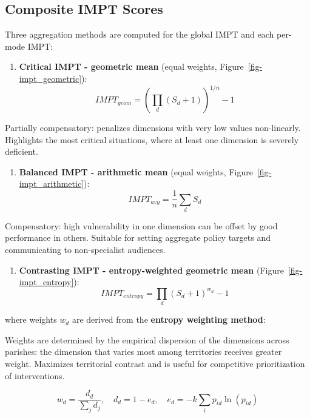 \documentclass[
  authoryear,
  review,
  1p]{elsarticle}
\providecommand{\tightlist}{%
  \setlength{\itemsep}{0pt}\setlength{\parskip}{0pt}}
\begin{document}
\subsection{Composite IMPT Scores}\label{sec-MET_composite_impt}

Three aggregation methods are computed for the global IMPT and each
per-mode IMPT:

\begin{enumerate}
\def\labelenumi{\arabic{enumi}.}
\tightlist
\item
  \textbf{Critical IMPT - geometric mean} (equal weights,
  Figure~\ref{fig-impt_geometric}):
  \[IMPT_{geom} = \left(\prod_{d} (S_d + 1)\right)^{1/n} - 1\]
\end{enumerate}

Partially compensatory: penalizes dimensions with very low values
non-linearly. Highlights the most critical situations, where at least
one dimension is severely deficient.

\begin{enumerate}
\def\labelenumi{\arabic{enumi}.}
\setcounter{enumi}{1}
\tightlist
\item
  \textbf{Balanced IMPT - arithmetic mean} (equal weights,
  Figure~\ref{fig-impt_arithmetic}):
  \[IMPT_{avg} = \frac{1}{n} \sum_d S_d\]
\end{enumerate}

Compensatory: high vulnerability in one dimension can be offset by good
performance in others. Suitable for setting aggregate policy targets and
communicating to non-specialist audiences.

\begin{enumerate}
\def\labelenumi{\arabic{enumi}.}
\setcounter{enumi}{2}
\tightlist
\item
  \textbf{Contrasting IMPT - entropy-weighted geometric mean}
  (Figure~\ref{fig-impt_entropy}):
  \[IMPT_{entropy} = \prod_d (S_d + 1)^{w_d} - 1\]
\end{enumerate}

where weights \(w_d\) are derived from the \textbf{entropy weighting
method}:

Weights are determined by the empirical dispersion of the dimensions
across parishes: the dimension that varies most among territories
receives greater weight. Maximizes territorial contrast and is useful
for competitive prioritization of interventions.

\[w_d = \frac{d_d}{\sum_j d_j}, \quad d_d = 1 - e_d, \quad e_d = -k \sum_i p_{id} \ln(p_{id})\]
\end{document}
